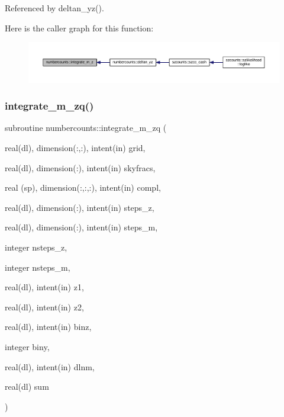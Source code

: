 Referenced by deltan\+\_\+yz().

Here is the caller graph for this function\+:
\nopagebreak
\begin{figure}[H]
\begin{center}
\leavevmode
\includegraphics[width=350pt]{namespacenumbercounts_ad089fdedf2c506bc8fc9dfb1ce45c024_icgraph}
\end{center}
\end{figure}
\mbox{\label{namespacenumbercounts_ab1013e4cf6773ad5eef3b128285b1dff}} 
\subsubsection{\texorpdfstring{integrate\+\_\+m\+\_\+zq()}{integrate\_m\_zq()}}
{\footnotesize\ttfamily subroutine numbercounts\+::integrate\+\_\+m\+\_\+zq (\begin{DoxyParamCaption}\item[{real(dl), dimension(\+:,\+:), intent(in)}]{grid,  }\item[{real(dl), dimension(\+:), intent(in)}]{skyfracs,  }\item[{real (sp), dimension(\+:,\+:,\+:), intent(in)}]{compl,  }\item[{real(dl), dimension(\+:), intent(in)}]{steps\+\_\+z,  }\item[{real(dl), dimension(\+:), intent(in)}]{steps\+\_\+m,  }\item[{integer}]{nsteps\+\_\+z,  }\item[{integer}]{nsteps\+\_\+m,  }\item[{real(dl), intent(in)}]{z1,  }\item[{real(dl), intent(in)}]{z2,  }\item[{real(dl), intent(in)}]{binz,  }\item[{integer}]{biny,  }\item[{real(dl), intent(in)}]{dlnm,  }\item[{real(dl)}]{sum }\end{DoxyParamCaption})}



